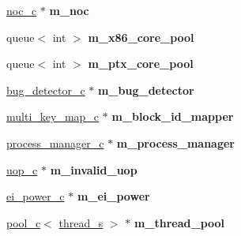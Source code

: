 \begin{DoxyCompactItemize}
\item 
\hypertarget{classmacsim__c_a9e630e22667f3c213e3a7bf324774273}{
\hyperlink{classnoc__c}{noc\_\-c} $\ast$ {\bfseries m\_\-noc}}
\label{classmacsim__c_a9e630e22667f3c213e3a7bf324774273}

\item 
\hypertarget{classmacsim__c_afe8210473b0073f7ad72cee863fc98be}{
queue$<$ int $>$ {\bfseries m\_\-x86\_\-core\_\-pool}}
\label{classmacsim__c_afe8210473b0073f7ad72cee863fc98be}

\item 
\hypertarget{classmacsim__c_ae9ead2bf6d0a161f72a50a5c22562752}{
queue$<$ int $>$ {\bfseries m\_\-ptx\_\-core\_\-pool}}
\label{classmacsim__c_ae9ead2bf6d0a161f72a50a5c22562752}

\item 
\hypertarget{classmacsim__c_ac694c08a40e42f83ef383bbe9266fb30}{
\hyperlink{classbug__detector__c}{bug\_\-detector\_\-c} $\ast$ {\bfseries m\_\-bug\_\-detector}}
\label{classmacsim__c_ac694c08a40e42f83ef383bbe9266fb30}

\item 
\hypertarget{classmacsim__c_a5f048e64e73788988fc8874226c0645d}{
\hyperlink{classmulti__key__map__c}{multi\_\-key\_\-map\_\-c} $\ast$ {\bfseries m\_\-block\_\-id\_\-mapper}}
\label{classmacsim__c_a5f048e64e73788988fc8874226c0645d}

\item 
\hypertarget{classmacsim__c_ad038c08ff8163e6a93aaea780aef4ed1}{
\hyperlink{classprocess__manager__c}{process\_\-manager\_\-c} $\ast$ {\bfseries m\_\-process\_\-manager}}
\label{classmacsim__c_ad038c08ff8163e6a93aaea780aef4ed1}

\item 
\hypertarget{classmacsim__c_a46d8f1f11c59a31e69299792fc2a118f}{
\hyperlink{classuop__c}{uop\_\-c} $\ast$ {\bfseries m\_\-invalid\_\-uop}}
\label{classmacsim__c_a46d8f1f11c59a31e69299792fc2a118f}

\item 
\hypertarget{classmacsim__c_ad6d9b4e9baa7d966f63233cfa7ebc38f}{
\hyperlink{classei__power__c}{ei\_\-power\_\-c} $\ast$ {\bfseries m\_\-ei\_\-power}}
\label{classmacsim__c_ad6d9b4e9baa7d966f63233cfa7ebc38f}

\item 
\hypertarget{classmacsim__c_a88df74852e044fcf67a5d696b48bc666}{
\hyperlink{classpool__c}{pool\_\-c}$<$ \hyperlink{structthread__s}{thread\_\-s} $>$ $\ast$ {\bfseries m\_\-thread\_\-pool}}
\label{classmacsim__c_a88df74852e044fcf67a5d696b48bc666}


\end{DoxyCompactItemize}
